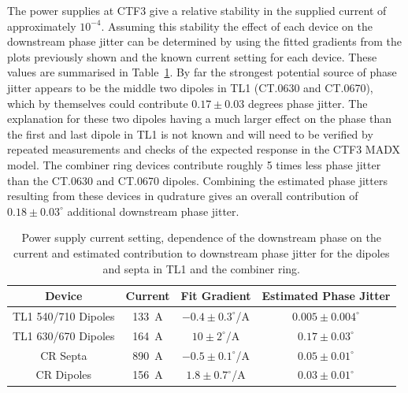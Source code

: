 The power supplies at CTF3 give a relative stability in the supplied current of approximately \(10^{-4}\). Assuming this stability the effect of each device on the downstream phase jitter can be determined by using the fitted gradients from the plots previously shown and the known current setting for each device. These values are summarised in Table~\ref{t:otherJitSources}. By far the strongest potential source of phase jitter appears to be the middle two dipoles in TL1 (CT.0630 and CT.0670), which by themselves could contribute \(0.17\pm0.03\) degrees phase jitter. The explanation for these two dipoles having a much larger effect on the phase than the first and last dipole in TL1 is not known and will need to be verified by repeated measurements and checks of the expected response in the CTF3 MADX model. The combiner ring devices contribute roughly 5 times less phase jitter than the CT.0630 and CT.0670 dipoles. Combining the estimated phase jitters resulting from these devices in qudrature gives an overall contribution of \(0.18\pm0.03^\circ\) additional downstream phase jitter.

\begin{table}
  \begin{center}
    \begin{tabular}{| c c c c |}
	   \hline
       Device & Current & Fit Gradient & Estimated Phase Jitter \\ \hline
       TL1 540/710 Dipoles & 133~A & \(-0.4\pm0.3^\circ\)/A & \(0.005\pm0.004^\circ\)\\
       TL1 630/670 Dipoles & 164~A & \(10\pm2^\circ\)/A & \(0.17\pm0.03^\circ\)\\
       CR Septa & 890~A &  \(-0.5\pm0.1^\circ\)/A & \(0.05\pm0.01^\circ\)\\
       CR Dipoles & 156~A & \(1.8\pm0.7^\circ\)/A & \(0.03\pm0.01^\circ\)\\ \hline 
    \end{tabular}
    \caption{Power supply current setting, dependence of the downstream phase on the current and estimated contribution to downstream phase jitter for the dipoles and septa in TL1 and the combiner ring.}
  	\label{t:otherJitSources}
  \end{center}
\end{table}


